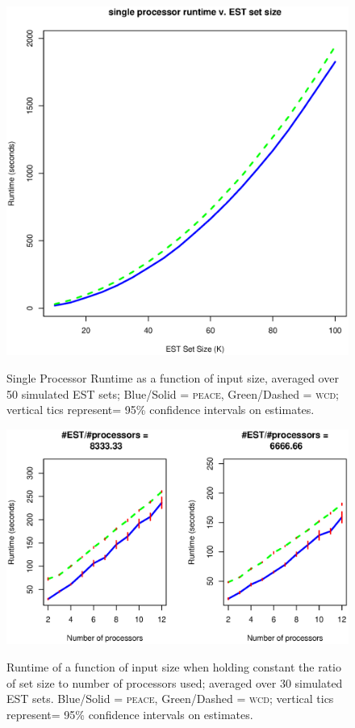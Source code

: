 \documentclass[a4paper,12pt]{article}
\begin{document}
\begin{appendix}
\begin{figure}[tbp]
\centerline{
\includegraphics[scale=0.35]{seq_time.eps}
\label{seq_runtime}
}
\caption{Single Processor Runtime as a function of input size,
  averaged over 50 simulated EST sets; Blue/Solid = \textsc{peace},
  Green/Dashed = \textsc{wcd}; vertical tics represent= 95\% confidence
  intervals on estimates.}
\end{figure}
\begin{figure}[tbp]
\centerline{
\includegraphics[scale=0.5]{par_time.eps}
\label{par_runtime}
}
\caption{Runtime of a function of input size when holding constant the
  ratio of set size to number of processors used; averaged over 30
  simulated EST sets.  Blue/Solid = \textsc{peace}, Green/Dashed = \textsc{wcd};
  vertical tics represent= 95\% confidence intervals on estimates.}
\end{figure}


\end{appendix}
\end{document}
